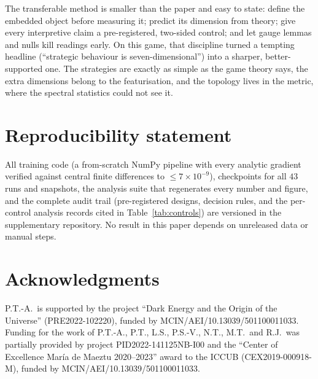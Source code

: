 \documentclass[twoside,11pt]{article}
\begin{document}
The transferable method is smaller than the paper and easy to state:
define the embedded object before measuring it; predict its dimension
from theory; give every interpretive claim a pre-registered, two-sided
control; and let gauge lemmas and nulls kill readings early.  On this
game, that discipline turned a tempting headline (``strategic
behaviour is seven-dimensional'') into a sharper, better-supported
one.  The strategies are exactly as simple as the game theory says,
the extra dimensions belong to the featurisation, and the topology
lives in the metric, where the spectral statistics could not see it.

\section*{Reproducibility statement}
All training code (a from-scratch NumPy pipeline with every analytic
gradient verified against central finite differences to
$\le 7\times10^{-9}$), checkpoints for all $43$ runs and snapshots,
the analysis suite that regenerates every number and figure, and the
complete audit trail (pre-registered designs, decision rules, and the
per-control analysis records cited in Table~\ref{tab:controls}) are
versioned in the supplementary repository.  No result in this paper
depends on unreleased data or manual steps.

\section*{Acknowledgments}
P.T.-A.\ is supported by the project ``Dark Energy and the Origin of
the Universe'' (PRE2022-102220), funded by
MCIN/AEI/10.13039/501100011033.  Funding for the work of P.T.-A.,
P.T., L.S., P.S.-V., N.T., M.T.\ and R.J.\ was partially provided by
project PID2022-141125NB-I00 and the ``Center of Excellence María de
Maeztu 2020--2023'' award to the ICCUB (CEX2019-000918-M), funded by
MCIN/AEI/10.13039/501100011033.
\end{document}
